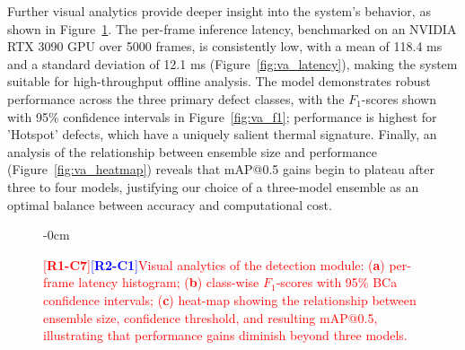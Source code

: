 \documentclass[energies,article,submit,pdftex,moreauthors]{Definitions/mdpi}
\newcommand{\revtag}[2]{[\textbf{R#1-C#2}]}
\newcommand{\Rone}[1]{\textcolor{red}{#1}}
\newcommand{\Rtwo}[1]{\textcolor{blue}{#1}}
\begin{document}
Further visual analytics provide deeper insight into the system's behavior, as shown in Figure~\ref{fig:visual_analytics}. The per-frame inference latency, benchmarked on an NVIDIA RTX 3090 GPU over 5000 frames, is consistently low, with a mean of 118.4 ms and a standard deviation of 12.1 ms (Figure~\ref{fig:va_latency}), making the system suitable for high-throughput offline analysis. The model demonstrates robust performance across the three primary defect classes, with the \(F_{1}\)-scores shown with 95\% confidence intervals in Figure~\ref{fig:va_f1}; performance is highest for 'Hotspot' defects, which have a uniquely salient thermal signature. Finally, an analysis of the relationship between ensemble size and performance (Figure~\ref{fig:va_heatmap}) reveals that mAP@0.5 gains begin to plateau after three to four models, justifying our choice of a three-model ensemble as an optimal balance between accuracy and computational cost.

\begin{figure}[!htb]
\begin{adjustwidth}{-\extralength}{0cm}
\centering
{}
\hfill
{}
\hfill
{}
\end{adjustwidth}
\caption{\Rone{\revtag{1}{7}\Rtwo{\revtag{2}{1}}Visual analytics of the detection module: (\textbf{a}) per-frame latency histogram; (\textbf{b}) class-wise \(F_{1}\)-scores with 95\% BCa confidence intervals; (\textbf{c}) heat-map showing the relationship between ensemble size, confidence threshold, and resulting mAP@0.5, illustrating that performance gains diminish beyond three models.}}
\label{fig:visual_analytics}
\end{figure}
\end{document}

